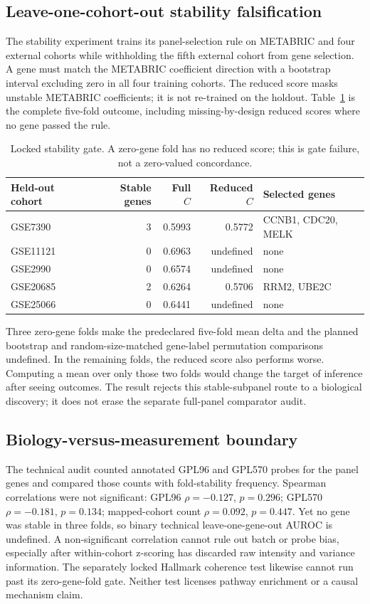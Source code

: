 \subsection{Leave-one-cohort-out stability falsification}
The stability experiment trains its panel-selection rule on METABRIC and four external cohorts while withholding the fifth external cohort from gene selection. A gene must match the METABRIC coefficient direction with a bootstrap interval excluding zero in all four training cohorts. The reduced score masks unstable METABRIC coefficients; it is not re-trained on the holdout. Table~\ref{tab:stability-audit} is the complete five-fold outcome, including missing-by-design reduced scores where no gene passed the rule.
\begin{table}[htbp]\centering\small
\begin{tabular}{lrrrl}\hline
Held-out cohort & Stable genes & Full $C$ & Reduced $C$ & Selected genes \\ \hline
GSE7390 & 3 & 0.5993 & 0.5772 & CCNB1, CDC20, MELK \\
GSE11121 & 0 & 0.6963 & undefined & none \\
GSE2990 & 0 & 0.6574 & undefined & none \\
GSE20685 & 2 & 0.6264 & 0.5706 & RRM2, UBE2C \\
GSE25066 & 0 & 0.6441 & undefined & none \\
\hline\end{tabular}
\caption{Locked stability gate. A zero-gene fold has no reduced score; this is gate failure, not a zero-valued concordance.}\label{tab:stability-audit}
\end{table}
\par Three zero-gene folds make the predeclared five-fold mean delta and the planned bootstrap and random-size-matched gene-label permutation comparisons undefined. In the remaining folds, the reduced score also performs worse. Computing a mean over only those two folds would change the target of inference after seeing outcomes. The result rejects this stable-subpanel route to a biological discovery; it does not erase the separate full-panel comparator audit.
\subsection{Biology-versus-measurement boundary}
The technical audit counted annotated GPL96 and GPL570 probes for the panel genes and compared those counts with fold-stability frequency. Spearman correlations were not significant: GPL96 $\rho=-0.127$, $p=0.296$; GPL570 $\rho=-0.181$, $p=0.134$; mapped-cohort count $\rho=0.092$, $p=0.447$. Yet no gene was stable in three folds, so binary technical leave-one-gene-out AUROC is undefined. A non-significant correlation cannot rule out batch or probe bias, especially after within-cohort z-scoring has discarded raw intensity and variance information. The separately locked Hallmark coherence test likewise cannot run past its zero-gene-fold gate. Neither test licenses pathway enrichment or a causal mechanism claim.
